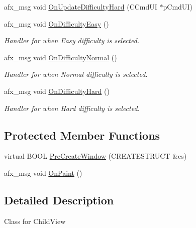 \begin{DoxyCompactItemize}
\item 
afx\+\_\+msg void \mbox{\hyperlink{class_c_child_view_a77809df4958d80ea45a09c4d3f3412e7}{On\+Update\+Difficulty\+Hard}} (C\+Cmd\+UI $\ast$p\+Cmd\+UI)
\item 
\mbox{\label{class_c_child_view_ac1883ad109d043e758e6e51838505c7e}} 
afx\+\_\+msg void \mbox{\hyperlink{class_c_child_view_ac1883ad109d043e758e6e51838505c7e}{On\+Difficulty\+Easy}} ()
\begin{DoxyCompactList}\small\item\em Handler for when Easy difficulty is selected. \end{DoxyCompactList}\item 
\mbox{\label{class_c_child_view_a449fed8583aed34b806b8d68e59c9743}} 
afx\+\_\+msg void \mbox{\hyperlink{class_c_child_view_a449fed8583aed34b806b8d68e59c9743}{On\+Difficulty\+Normal}} ()
\begin{DoxyCompactList}\small\item\em Handler for when Normal difficulty is selected. \end{DoxyCompactList}\item 
\mbox{\label{class_c_child_view_a30b428c1ef383c8d4e91f1bab8c53f42}} 
afx\+\_\+msg void \mbox{\hyperlink{class_c_child_view_a30b428c1ef383c8d4e91f1bab8c53f42}{On\+Difficulty\+Hard}} ()
\begin{DoxyCompactList}\small\item\em Handler for when Hard difficulty is selected. \end{DoxyCompactList}\end{DoxyCompactItemize}
\subsection*{Protected Member Functions}
\begin{DoxyCompactItemize}
\item 
virtual B\+O\+OL \mbox{\hyperlink{class_c_child_view_a07e87a6c3606422ff10d45a47d702c7e}{Pre\+Create\+Window}} (C\+R\+E\+A\+T\+E\+S\+T\+R\+U\+CT \&cs)
\item 
afx\+\_\+msg void \mbox{\hyperlink{class_c_child_view_a8ea6d42631a4f9f446923ff864b239ab}{On\+Paint}} ()
\end{DoxyCompactItemize}


\subsection{Detailed Description}
Class for Child\+View 

